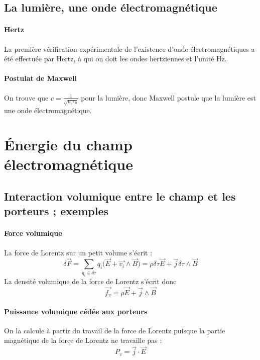 \documentclass[french]{book}
\theoremstyle{plain}
\theoremstyle{definition}
\theoremstyle{remark}
\begin{document}
\subsection{La lumière, une onde électromagnétique}

\paragraph{Hertz} La première vérification expérimentale de l'existence d'onde électromagnétiques a été effectuée par Hertz, à qui on doit les ondes hertziennes et l'unité Hz.

\paragraph{Postulat de Maxwell} On trouve que $c=\displaystyle\frac{1}{\sqrt{\mu_0\varepsilon_0}}$ pour la lumière, donc Maxwell postule que la lumière est une onde électromagnétique.

\section{Énergie du champ électromagnétique}

\subsection{Interaction volumique entre le champ et les porteurs ; exemples}

\paragraph{Force volumique} La force de Lorentz sur un petit volume s'écrit : $$\delta\overrightarrow{F}=\sum_{q_i\in\delta\tau}q_i\bigg(\overrightarrow{E}+\overrightarrow{v_i}\wedge\overrightarrow{B}\bigg)=\rho\delta\tau\overrightarrow{E}+\overrightarrow{j}\delta\tau\wedge\overrightarrow{B}$$ La densité volumique de la force de Lorentz s'écrit donc $$\overrightarrow{f_v}=\rho\overrightarrow{E}+\overrightarrow{j}\wedge\overrightarrow{B}$$

\paragraph{Puissance volumique cédée aux porteurs} On la calcule à partir du travail de la force de Lorentz puisque la partie magnétique de la force de Lorentz ne travaille pas : $$P_v=\overrightarrow{j}\cdot\overrightarrow{E}$$
\end{document}
